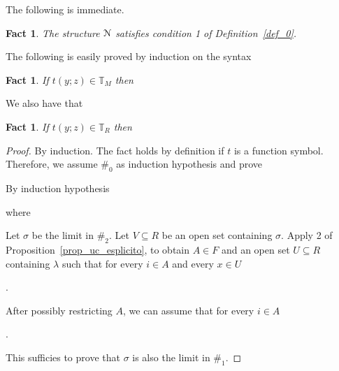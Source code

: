 \documentclass[12pt,letterpaper,oneside,reqno]{amsart}
\theoremstyle{plain}
\newtheorem{fact}[theorem]{Fact}
\theoremstyle{remark}
\begin{document}
The following is immediate.

\begin{fact}\label{fact_termini1}
  The structure ${\EuScript N}$ satisfies condition 1 of Definition~\ref{def_0}.
\end{fact}

The following is easily proved by induction on the syntax

\begin{fact}\label{fact_easy_induz}
  If  $t(y;z)\in \mathds{T}_M$ then 
  
  \hfill\qedsymbol
\end{fact}

We also have that

\begin{fact}
  If  $t(y;z)\in \mathds{T}_R$ then 
  
\end{fact}

\begin{proof}
  By induction. 
  The fact holds by definition if $t$ is a function symbol.
  Therefore, we assume $\#_0$ as induction hypothesis and prove 


  By induction hypothesis 

  
  where 
  

  Let $\sigma$ be the limit in $\#_2$.
  Let $V\subseteq R$ be an open set containing $\sigma$.
  Apply 2 of Proposition~\ref{prop_uc_esplicito}, to obtain $A\in F$ and an open set $U\subseteq R$ containing $\lambda$ such that for every $i\in A$ and every $x\in U$
  
  .

  After possibly restricting $A$, we can assume that for every $i\in A$ 

  .

  This sufficies to prove that $\sigma$ is also the limit in $\#_1$.
\end{proof}
\end{document}
